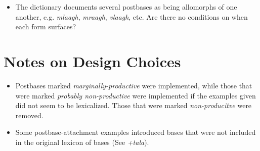 \documentclass{article}
\begin{document}
\begin{itemize}
\renewcommand\labelitemi{$\cdot$}

\item The dictionary documents several postbases as being allomorphs of one another, e.g. \textit{mlaagh}, \textit{mraagh}, \textit{vlaagh}, etc.
%
Are there no conditions on when each form surfaces?

\end{itemize}



\section{Notes on Design Choices}

\begin{itemize}
\renewcommand\labelitemi{$\cdot$}

\item Postbases marked \textit{marginally-productive} were implemented, while those that were marked \textit{probably non-productive} were implemented if the examples given did not seem to be lexicalized.
%
Those that were marked \textit{non-producitve} were removed.

\item Some postbase-attachment examples introduced bases that were not included in the original lexicon of bases (See \textit{+tala}).

\end{itemize}
\end{document}
